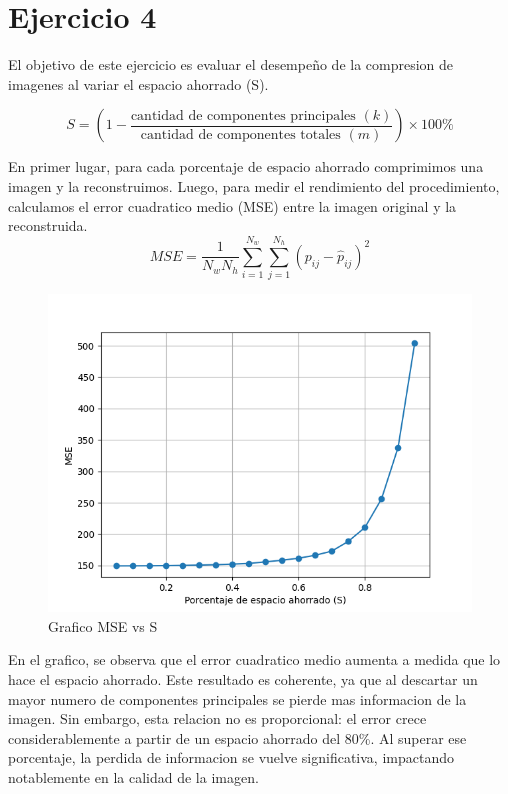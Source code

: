 \documentclass[a4paper,12pt]{article}
\begin{document}
\section{Ejercicio 4}
El objetivo de este ejercicio es evaluar el desempeño de la compresion de imagenes al variar el espacio ahorrado (S). 

\begin{equation}
S = \left( 1 - \frac{\text{cantidad de componentes principales } (k)}{\text{cantidad de componentes totales } (m)} \right) \times 100 \%
\end{equation}

En primer lugar, para cada porcentaje de espacio ahorrado comprimimos una imagen y la reconstruimos. Luego, para 
medir el rendimiento del procedimiento, calculamos el error cuadratico medio (MSE) entre la imagen original y 
la reconstruida. 
\begin{equation}
MSE = \frac{1}{N_w N_h} \sum_{i=1}^{N_w} \sum_{j=1}^{N_h} (p_{ij} - \hat{p}_{ij})^2
\end{equation}

\begin{figure}[H]
    \centering
    \includegraphics[width=1\textwidth]{Ejercicio 4a.png}
    \caption{Grafico MSE vs S}
    \label{fig:ej4}
\end{figure}

En el grafico, se observa que el error cuadratico medio aumenta a medida que lo hace el espacio ahorrado.
Este resultado es coherente, ya que al descartar un mayor numero de componentes principales se pierde mas 
informacion de la imagen. 
Sin embargo, esta relacion no es proporcional: el error crece considerablemente a partir de un espacio 
ahorrado del 80\%. Al superar ese porcentaje, la perdida de informacion se vuelve significativa, 
impactando notablemente en la calidad de la imagen. 
\end{document}
